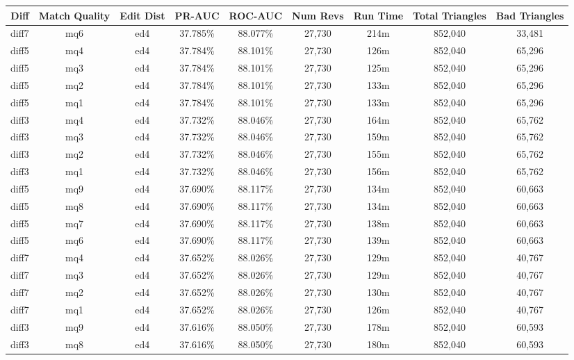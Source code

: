 \begin{sidewaystable}[!ph]
  \begin{center}
    \begin{tabular}{|c|c|c||c|c||c|c|c|c|}
\hline
Diff & Match Quality & Edit Dist
        & PR-AUC & ROC-AUC
        & Num Revs & Run Time
        & Total Triangles & Bad Triangles \\
\hline
\hline
diff7 & mq6 & ed4 & 37.785\% & 88.077\% & 27,730 & 214m & 852,040 & 33,481 \\
diff5 & mq4 & ed4 & 37.784\% & 88.101\% & 27,730 & 126m & 852,040 & 65,296 \\
diff5 & mq3 & ed4 & 37.784\% & 88.101\% & 27,730 & 125m & 852,040 & 65,296 \\
diff5 & mq2 & ed4 & 37.784\% & 88.101\% & 27,730 & 133m & 852,040 & 65,296 \\
diff5 & mq1 & ed4 & 37.784\% & 88.101\% & 27,730 & 133m & 852,040 & 65,296 \\
diff3 & mq4 & ed4 & 37.732\% & 88.046\% & 27,730 & 164m & 852,040 & 65,762 \\
diff3 & mq3 & ed4 & 37.732\% & 88.046\% & 27,730 & 159m & 852,040 & 65,762 \\
diff3 & mq2 & ed4 & 37.732\% & 88.046\% & 27,730 & 155m & 852,040 & 65,762 \\
diff3 & mq1 & ed4 & 37.732\% & 88.046\% & 27,730 & 156m & 852,040 & 65,762 \\
diff5 & mq9 & ed4 & 37.690\% & 88.117\% & 27,730 & 134m & 852,040 & 60,663 \\
diff5 & mq8 & ed4 & 37.690\% & 88.117\% & 27,730 & 134m & 852,040 & 60,663 \\
diff5 & mq7 & ed4 & 37.690\% & 88.117\% & 27,730 & 138m & 852,040 & 60,663 \\
diff5 & mq6 & ed4 & 37.690\% & 88.117\% & 27,730 & 139m & 852,040 & 60,663 \\
diff7 & mq4 & ed4 & 37.652\% & 88.026\% & 27,730 & 129m & 852,040 & 40,767 \\
diff7 & mq3 & ed4 & 37.652\% & 88.026\% & 27,730 & 129m & 852,040 & 40,767 \\
diff7 & mq2 & ed4 & 37.652\% & 88.026\% & 27,730 & 130m & 852,040 & 40,767 \\
diff7 & mq1 & ed4 & 37.652\% & 88.026\% & 27,730 & 126m & 852,040 & 40,767 \\
diff3 & mq9 & ed4 & 37.616\% & 88.050\% & 27,730 & 178m & 852,040 & 60,593 \\
diff3 & mq8 & ed4 & 37.616\% & 88.050\% & 27,730 & 180m & 852,040 & 60,593 \\

\end{tabular}
\end{center}
\end{sidewaystable}
